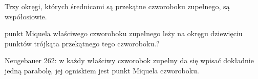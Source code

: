\begin{theorem}
	Trzy okręgi, których średnicami są przekątne czworoboku zupełnego, są współosiowie.
\end{theorem}

\begin{theorem}[Jemieljanowa?]
	punkt Miquela właściwego czworoboku zupełnego leży na okręgu dziewięciu punktów trójkąta przekątnego tego czworoboku.?
\end{theorem}

\begin{proposition}
	Neugebauer 262: w każdy właściwy czworobok zupełny da się wpisać dokładnie jedną parabolę, jej ogniskiem jest punkt Miquela czworoboku.
\end{proposition}